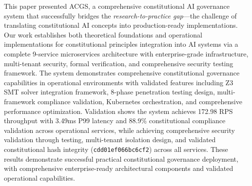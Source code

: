 \documentclass[manuscript,screen,9pt]{acmart}
\begin{document}
This paper presented ACGS, a comprehensive constitutional AI governance system that successfully bridges the \textit{research-to-practice gap}—the challenge of translating constitutional AI concepts into production-ready implementations. Our work establishes both theoretical foundations and operational implementations for constitutional principles integration into AI systems via a complete 9-service microservices architecture with enterprise-grade infrastructure, multi-tenant security, formal verification, and comprehensive security testing framework. The system demonstrates comprehensive constitutional governance capabilities in operational environments with validated features including Z3 SMT solver integration framework, 8-phase penetration testing design, multi-framework compliance validation, Kubernetes orchestration, and comprehensive performance optimization. Validation shows the system achieves 172.98 RPS throughput with 3.49ms P99 latency and 88.9\% constitutional compliance validation across operational services, while achieving comprehensive security validation through testing, multi-tenant isolation design, and validated constitutional hash integrity (\texttt{cdd01ef066bc6cf2\cite{perf-report}\cite{perf-report}}) across all services. These results demonstrate successful practical constitutional governance deployment, with comprehensive enterprise-ready architectural components and validated operational capabilities.
\end{document}
